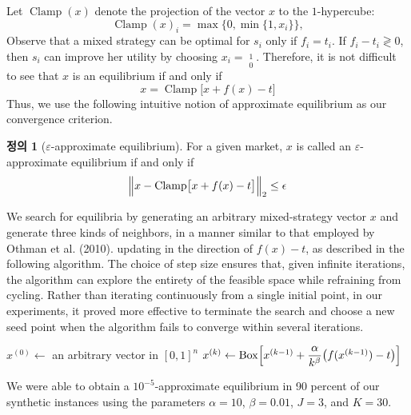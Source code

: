 \documentclass[12pt]{article} %
\theoremstyle{definition}
\newtheorem{definition}{Definition}
\theoremstyle{definition}
\newtheorem{definition}{정의}
\begin{document}
Let $\operatorname{Clamp}(x)$ denote the projection of the vector $x$ to the $1$-hypercube:
\begin{equation}\operatorname{Clamp}(x)_i = \max\bigl\{0, \min\{1, x_i \}\bigr\}, \end{equation}
Observe that a mixed strategy can be optimal for $s_i$ only if $f_i = t_i$. If $f_i  - t_i \gtrless 0$, then $s_i$ can improve her utility by choosing $x_i = \operatorname{}\limits^1_0$. Therefore, it is not difficult to see that $x$ is an equilibrium if and only if
\begin{equation}x = \operatorname{Clamp}\bigl[x + f(x) - t\bigr] \end{equation}
Thus, we use the following intuitive notion of approximate equilibrium as our convergence criterion.
\begin{definition}[$\varepsilon$-approximate equilibrium]
For a given market, $x$ is called an $\varepsilon$-approximate equilibrium if and only if
\[ \Bigl\|x - \operatorname{Clamp}\bigl[x + f(x) - t\bigr] \Bigr\|_2 \leq \epsilon\]
\end{definition}
We search for equilibria by generating an arbitrary mixed-strategy vector $x$ and generate three kinds of neighbors, in a manner similar to that employed by Othman et al. (2010).  updating in the direction of $f(x) - t$, as described in the following algorithm. The choice of step size ensures that, given infinite iterations, the algorithm can explore the entirety of the feasible space while refraining from cycling. Rather than iterating continuously from a single initial point, in our experiments, it proved more effective to terminate the search and choose a new seed point when the algorithm fails to converge within several iterations. 

\begin{algorithm}[H] 
\caption{Equilibrium algorithm for quadratic school preferences.} \label{eqalgoquadschoolpref}
{
    $x^{(0)} \gets$ an arbitrary vector in $[0, 1]^n$\;
    {
         $x^{(k)} \gets \operatorname{Box}\Bigl[x^{(k-1)} + \dfrac{\alpha}{k^\beta} \bigl(f(x^{(k-1)}) - t\bigr)\Bigr]$\;
    }
}
\end{algorithm}

We were able to obtain a $10^{-5}$-approximate equilibrium in 90 percent of our synthetic instances using the parameters $\alpha = 10$, $\beta = 0.01$, $J = 3$, and $K = 30$.
\end{document}
